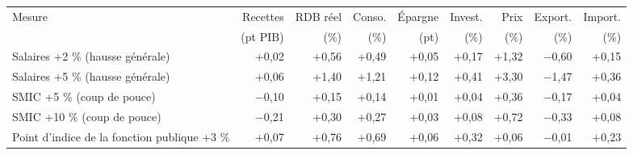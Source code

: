\begin{tabular}{p{5.0cm}rrrrrrrr}
\toprule
Mesure & Recettes & RDB réel & Conso. & Épargne & Invest. & Prix & Export. & Import. \\
 & (pt PIB) & (\%) & (\%) & (pt) & (\%) & (\%) & (\%) & (\%) \\
\midrule
Salaires +2 \% (hausse générale) & +0{,}02 & +0{,}56 & +0{,}49 & +0{,}05 & +0{,}17 & +1{,}32 & $-$0{,}60 & +0{,}15 \\
Salaires +5 \% (hausse générale) & +0{,}06 & +1{,}40 & +1{,}21 & +0{,}12 & +0{,}41 & +3{,}30 & $-$1{,}47 & +0{,}36 \\
SMIC +5 \% (coup de pouce) & $-$0{,}10 & +0{,}15 & +0{,}14 & +0{,}01 & +0{,}04 & +0{,}36 & $-$0{,}17 & +0{,}04 \\
SMIC +10 \% (coup de pouce) & $-$0{,}21 & +0{,}30 & +0{,}27 & +0{,}03 & +0{,}08 & +0{,}72 & $-$0{,}33 & +0{,}08 \\
Point d'indice de la fonction publique +3 \% & +0{,}07 & +0{,}76 & +0{,}69 & +0{,}06 & +0{,}32 & +0{,}06 & $-$0{,}01 & +0{,}23 \\
\bottomrule
\end{tabular}

